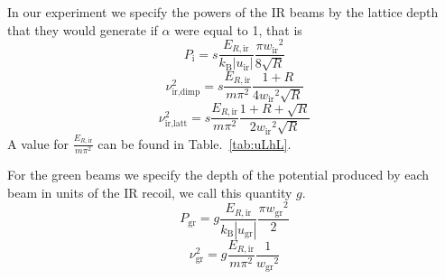 \documentclass[11pt,letter]{article}
\newcommand{\pin}{\ensuremath{ P_{\text{i}}} }
\newcommand{\wir}{\ensuremath{ w_{\text{ir}}} }
\newcommand{\pgr}{\ensuremath{ P_{\text{gr}}} }
\newcommand{\wgr}{\ensuremath{ w_{\text{gr}}} }
\begin{document}
In our experiment we specify the powers of the IR beams by the lattice depth
that they would generate if $\alpha$ were equal to 1, that is 
\begin{equation} 
  \pin =  s  \frac{ E_{R,\text{ir}} }{ k_{\text{B}} |u_{\text{ir}}| } 
          \frac{ \pi \wir^{2} }{ 8 \sqrt{R}}
\end{equation}
\begin{equation}
 \nu_{\text{ir,dimp}}^{2} 	= s \frac{ E_{R,\text{ir}}  }{m\pi^{2}}
          \frac{ 1+R}{ 4 \wir^{2}\sqrt{R}} 
\end{equation}
\begin{equation}
 \nu_{\text{ir,latt}}^{2} 	= s \frac{ E_{R,\text{ir}}  }{m\pi^{2}}
          \frac{ 1+R+ \sqrt{R}}{ 2 \wir^{2}\sqrt{R}} 
\end{equation}
A value for $\frac{E_{R,\text{ir}}}{m\pi^{2}}$ can be found in
Table.~\ref{tab:uLhL}.

For the green beams we specify the depth of the potential produced by each beam
in units of the IR recoil, we call this quantity $g$. 
\begin{equation}
 \pgr = g \frac{E_{R,\text{ir}}}{k_{\text{B}} | u_{\text{gr}} | } 
  \frac{\pi \wgr^{2}} {2}
\end{equation}
\begin{equation}
  \nu_{\text{gr}}^{2} =  g  
   \frac{ E_{R,\text{ir}}    }{m\pi^{2}}
  \frac{1}{ \wgr^{2}} 
\end{equation}
\end{document}
